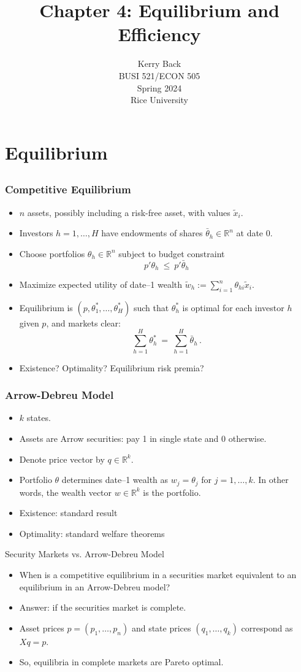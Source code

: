\documentclass[10pt]{beamer}
\title{Chapter 4: Equilibrium and Efficiency}
\date{}
\author{Kerry Back\\ 
BUSI 521/ECON 505\\
Spring 2024\\
Rice University}
\newcommand{\bi}{\begin{itemize}}
\newcommand{\ei}{\end{itemize}}
\newcommand{\im}{\item}
\newcommand{\myreal}{\ensuremath{\mathbb{R}}}
\newcommand{\bfr}{\begin{frame}}
\newcommand{\tw}{\tilde{w}}
\newcommand{\tx}{\tilde{x}}
\begin{document}

\begin{frame}[plain]
    \titlepage
  \end{frame}
  
  
  \section{Equilibrium}\subsection{}
  \bfr\frametitle{Competitive Equilibrium}
  \bi 
  \im $n$ assets, possibly including a risk-free asset, with values $\tx_i$.  
  \im Investors $h=1, \ldots, H$ have endowments of shares $\bar{\theta}_h \in \myreal^n$ at date 0.
  \im Choose portfolios $\theta_h \in \myreal^n$ subject to budget constraint
  $$p'\theta_h \ \le \ p'\bar{\theta}_h$$
  \im Maximize expected utility of date--1 wealth $\tw_h :=\sum_{i=1}^n \theta_{hi}\tx_i$.   
  \im Equilibrium is $(p,\theta^*_1, \ldots, \theta^*_H)$ such that $\theta^*_h$ is optimal for each investor $h$ given $p$, and markets clear:
  $$\sum_{h=1}^H \theta^*_h \ = \ \sum_{h=1}^H \bar{\theta}_h\,.$$
  \im  Existence?
  Optimality?  
  Equilibrium risk premia?
  \ei
  \end{frame}
  
  \bfr\frametitle{Arrow-Debreu Model}
  \bi 
  \im 
  $k$ states.  
  \im Assets are Arrow securities: pay 1 in single state and 0 otherwise.  
  \im Denote price vector by $q \in \myreal^k$.     
  \im Portfolio $\theta$ determines date--1 wealth as $w_j = \theta_j$ for $j=1, \ldots, k$.  In other words, the wealth vector $w \in \myreal^k$ is the portfolio.
  \im Existence: standard result
  \im Optimality: standard welfare theorems
  \ei 
  \end{frame}
  
  \begin{frame}{Security Markets vs. Arrow-Debreu Model}
    \bi 
    \im 
  When is a competitive equilibrium in a securities market equivalent to an equilibrium in an Arrow-Debreu model?
  \im   Answer: if the securities market is complete.
  \im Asset prices $p =(p_1, \ldots, p_n)$ and state prices $(q_1, \ldots, q_k)$ correspond as $Xq=p$.
  \im  So, equilibria in complete markets are Pareto optimal.
  \ei
  \end{frame}
  
\end{document}

